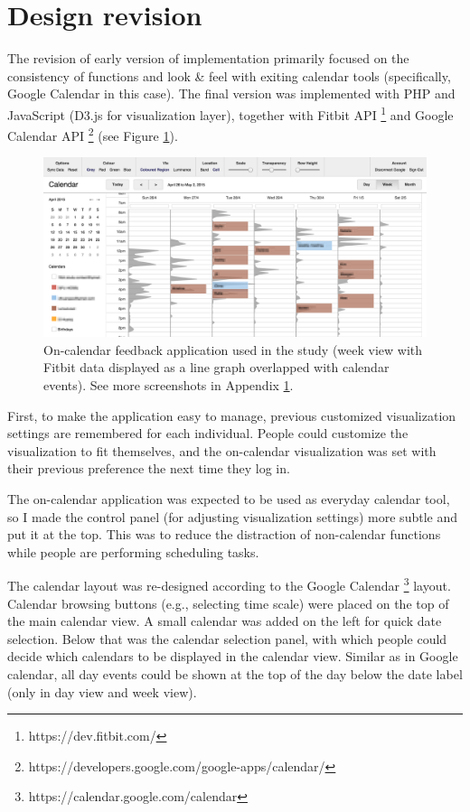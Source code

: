 \documentclass[12pt,oneside]{book}
\begin{document}
\section{Design revision}
The revision of early version of implementation primarily focused on the consistency of functions and look \& feel with exiting calendar tools (specifically, Google Calendar in this case). The final version was implemented with PHP and JavaScript (D3.js for visualization layer), together with Fitbit API \footnote{https://dev.fitbit.com/} and Google Calendar API \footnote{https://developers.google.com/google-apps/calendar/}  (see Figure \ref{fig:implementation2}).

\begin{figure}[h]
\centering
\includegraphics[width=\columnwidth]{figures/implementation2}
\caption{On-calendar feedback application used in the study (week view with Fitbit data displayed as a line graph overlapped with calendar events). See more screenshots in Appendix \ref{}. }
\label{fig:implementation2}
\end{figure}

First, to make the application easy to manage, previous customized visualization settings are remembered for each individual. People could customize the visualization to fit themselves, and the on-calendar visualization was set with their previous preference the next time they log in.

The on-calendar application was expected to be used as everyday calendar tool, so I made the control panel (for adjusting visualization settings) more subtle and put it at the top.  This was to reduce the distraction of non-calendar functions while people are performing scheduling tasks.

The calendar layout was re-designed according to the Google Calendar \footnote{https://calendar.google.com/calendar} layout. Calendar browsing buttons (e.g., selecting time scale) were placed on the top of the main calendar view. A small calendar was added on the left for quick date selection. Below that was the calendar selection panel, with which people could decide which calendars to be displayed in the calendar view. Similar as in Google calendar, all day events could be shown at the top of the day below the date label (only in day view and week view).
\end{document}
